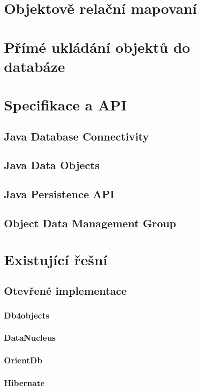 \section{Objektově relační mapovaní}

\section{Přímé ukládání objektů do databáze}

\section{Specifikace a API}
\subsection{Java Database Connectivity}
\cite{fisher:jdbc,donahue:jdpb}
\subsection{Java Data Objects}
\cite{jordan:jdo,roos:jdo,tyagi:cjdo,ezzio:uujdo}
\subsection{Java Persistence API}
\cite{jpa:spec}
\subsection{Object Data Management Group}
\cite{odmg}
\section{Existující řešní}
\subsection{Otevřené implementace}
\subsubsection{Db4objects}
\subsubsection{DataNucleus}
\subsubsection{OrientDb}
\subsubsection{Hibernate}
